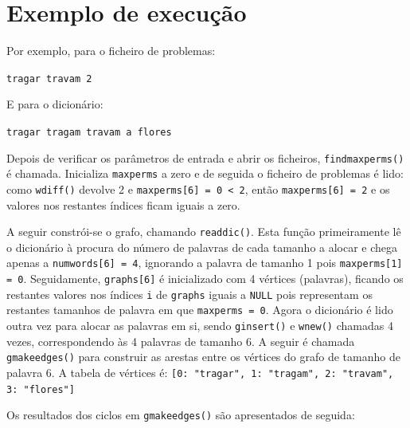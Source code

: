 \documentclass[a4paper, 18pt]{article}
\newcommand\tu[0]{\textunderscore}
\begin{document}
\section{Exemplo de execução}
	\par
	Por exemplo, para o ficheiro de problemas:
	\begin{center}
		\texttt{tragar travam 2}
	\end{center}
	\par
	E para o dicionário:
	\begin{center}
		\texttt{tragar tragam travam a flores}
	\end{center}
	\par
	Depois de verificar os parâmetros de entrada e abrir os ficheiros, \texttt{find\tu max\tu perms()} é chamada.
	Inicializa \texttt{max\tu perms} a zero e de seguida o ficheiro de problemas é lido: como \texttt{w\tu diff()} devolve 2 e \texttt{max\tu perms[6] = 0 < 2}, então \texttt{max\tu perms[6] = 2} e os valores nos restantes índices ficam iguais a zero.
	\par
	A seguir constrói-se o grafo, chamando \texttt{read\tu dic()}. Esta função primeiramente lê o dicionário à procura do número de palavras de cada tamanho a alocar e chega apenas a \texttt{num\tu words[6] = 4}, ignorando a palavra de tamanho 1  pois \texttt{max\tu perms[1] = 0}. Seguidamente, \texttt{graphs[6]} é inicializado com 4 vértices (palavras), ficando os restantes valores nos índices \texttt{i} de \texttt{graphs} iguais a \texttt{NULL} pois representam os restantes tamanhos de palavra em que \texttt{max\tu perms = 0}. Agora o dicionário é lido outra vez para alocar as palavras em si, sendo \texttt{g\tu insert()} e \texttt{w\tu new()} chamadas 4 vezes, correspondendo às 4 palavras de tamanho 6. A seguir é chamada \texttt{g\tu make\tu edges()} para construir as arestas entre os vértices do grafo de tamanho de palavra 6. A tabela de vértices é:
	\texttt{[0: "tragar", 1: "tragam", 2: "travam", 3: "flores"]}
	\par
	Os resultados dos ciclos em \texttt{g\tu make\tu edges()} são apresentados de seguida:
\end{document}
